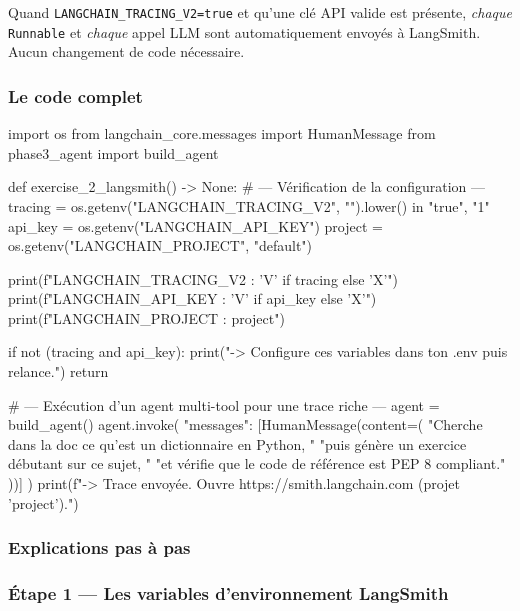 \documentclass[11pt,a4paper]{article}
\begin{document}
Quand \texttt{LANGCHAIN\_TRACING\_V2=true} et qu'une clé API valide est
présente, \emph{chaque} \texttt{Runnable} et \emph{chaque} appel LLM
sont automatiquement envoyés à LangSmith. Aucun changement de code
nécessaire.

\subsubsection{Le code complet}

\begin{pythoncode}
import os
from langchain_core.messages import HumanMessage
from phase3_agent import build_agent


def exercise_2_langsmith() -> None:
    # --- Vérification de la configuration ---
    tracing = os.getenv("LANGCHAIN_TRACING_V2", "").lower() in {"true", "1"}
    api_key = os.getenv("LANGCHAIN_API_KEY")
    project = os.getenv("LANGCHAIN_PROJECT", "default")

    print(f"LANGCHAIN_TRACING_V2 : {'V' if tracing else 'X'}")
    print(f"LANGCHAIN_API_KEY    : {'V' if api_key else 'X'}")
    print(f"LANGCHAIN_PROJECT    : {project}")

    if not (tracing and api_key):
        print("-> Configure ces variables dans ton .env puis relance.")
        return

    # --- Exécution d'un agent multi-tool pour une trace riche ---
    agent = build_agent()
    agent.invoke({
        "messages": [HumanMessage(content=(
            "Cherche dans la doc ce qu'est un dictionnaire en Python, "
            "puis génère un exercice débutant sur ce sujet, "
            "et vérifie que le code de référence est PEP 8 compliant."
        ))]
    })
    print(f"-> Trace envoyée. Ouvre https://smith.langchain.com (projet '{project}').")
\end{pythoncode}

\subsubsection{Explications pas à pas}

\subsubsection*{Étape 1 — Les variables d'environnement LangSmith}
\end{document}
